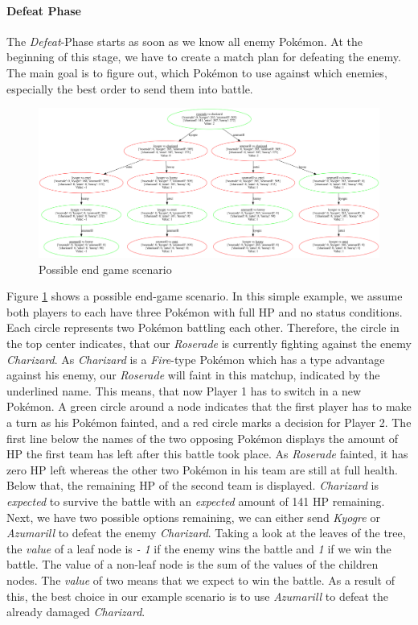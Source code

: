 \paragraph{Defeat Phase}
\label{ref:defeat-phase}
The \textit{Defeat}-Phase starts as soon as we know all enemy Pokémon. At the beginning of this stage, we have to create
a match plan for defeating the enemy. The main goal is to figure out, which Pokémon to use against which enemies, especially
the best order to send them into battle. 
\begin{figure}[h]
	\centering
	\includegraphics[width=1\textwidth]{images/MinMaxTree.png}
	\caption{Possible end game scenario}
	\label{fig:game-plan}
\end{figure}
Figure \ref{fig:game-plan} shows a possible end-game scenario. In this simple example, we assume both players to each
have three Pokémon with full \ac{HP} and no status conditions. Each circle represents two Pokémon battling each other.
Therefore, the circle in the top center indicates, that our \textit{Roserade} is currently fighting against the enemy
\textit{Charizard}. As \textit{Charizard} is a \textit{Fire}-type Pokémon which has a type advantage against his enemy,
our \textit{Roserade} will faint in this matchup, indicated by the underlined name. This means, that now Player 1 has to
switch in a new Pokémon. A green circle around a node indicates that the first player has to make a turn as his 
Pokémon fainted, and a red circle marks a decision for Player 2. The first line below the names of the two opposing
Pokémon displays the amount of \ac{HP} the first team has left after this battle took place. As \textit{Roserade} fainted,
it has zero \ac{HP} left whereas the other two Pokémon in his team are still at full health. Below that, the remaining 
\ac{HP} of the second team is displayed. \textit{Charizard} is \textit{expected} to survive the battle with an 
\textit{expected} amount of 141 \ac{HP} remaining. Next, we have two possible options remaining, we can either send
\textit{Kyogre} or \textit{Azumarill} to defeat the enemy \textit{Charizard}. Taking a look at the leaves of the tree,
the \textit{value} of a leaf node is \textit{- 1} if the enemy wins the battle and \textit{1} if we win the battle. 
The value of a non-leaf node is the sum of the values of the children nodes. The \textit{value} of two means that we 
expect to win the battle. As a result of this, the best choice in our example scenario is to use \textit{Azumarill} to 
defeat the already damaged \textit{Charizard}. \\

